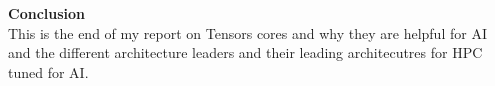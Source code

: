\documentclass[12pt]{article}
\begin{document}

\textbf{Conclusion}\\
This is the end of my report on Tensors cores and why they are helpful for AI and the different architecture leaders and their leading architecutres for HPC tuned for AI.
\end{document}

